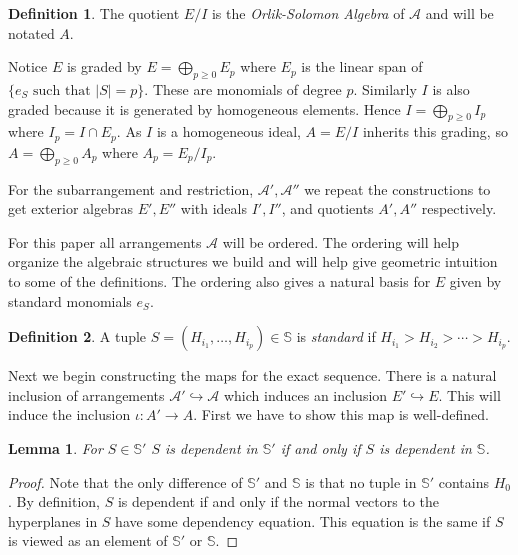 \documentclass[article,twoside]{article}
\newcommand{\BB}[1]{\mathbb{#1}}
\newcommand{\script}[1]{\mathcal{#1}}
\newcommand{\tuples}{\BB{S}}
\theoremstyle{plain}
\theoremstyle{plain}
\newtheorem{lemma}[lemma]{Lemma}
\theoremstyle{plain}
\theoremstyle{plain}
\theoremstyle{plain}
\theoremstyle{definition}
\newtheorem{definition}[definition]{Definition}
\theoremstyle{definition}
\theoremstyle{definition}
\theoremstyle{remark}
\theoremstyle{remark}
\begin{document}
\begin{definition}
	The quotient $E/I$ is the \emph{Orlik-Solomon Algebra} of $\script{A}$ and will be notated $A$.
\end{definition}

Notice $E$ is graded by $E=\bigoplus_{p\geq 0} E_p$ where $E_p$ is the linear span of $\{e_S \text{ such that } |S|=p\}$. These are monomials of degree $p$. Similarly $I$ is also graded because it is generated by homogeneous elements. Hence $I=\bigoplus_{p\geq 0} I_p$ where $I_p=I\cap E_p$. As $I$ is a homogeneous ideal, $A=E/I$ inherits this grading, so $A=\bigoplus_{p\geq 0} A_p$ where $A_p = E_p/I_p$.

For the subarrangement and restriction, $\script{A}',\script{A}''$ we repeat the constructions to get exterior algebras $E',E''$ with ideals $I',I''$, and quotients $A',A''$ respectively.

For this paper all arrangements $\script{A}$ will be ordered. The ordering will help organize the algebraic structures we build and will help give geometric intuition to some of the definitions. The ordering also gives a natural basis for $E$ given by standard monomials $e_S$.

\begin{definition}
	A tuple $S=(H_{i_1},\dots,H_{i_p})\in\tuples$ is \emph{standard} if $H_{i_1}>H_{i_2}>\cdots>H_{i_p}$.
\end{definition}





Next we begin constructing the maps for the exact sequence. There is a natural inclusion of arrangements $\script{A}'\hookrightarrow\script{A}$ which induces an inclusion $E'\hookrightarrow E$. This will induce the inclusion $\iota:A'\to A$. First we have to show this map is well-defined.

\begin{lemma}\label{dependency}
	For $S\in\tuples'$ $S$ is dependent in $\tuples'$ if and only if $S$ is dependent in $\tuples$.
\end{lemma}
\begin{proof}
	Note that the only difference of $\tuples'$ and $\tuples$ is that no tuple in $\tuples'$ contains $H_0$. By definition, $S$ is dependent if and only if the normal vectors to the hyperplanes in $S$ have some dependency equation. This equation is the same if $S$ is viewed as an element of $\tuples'$ or $\tuples$.
\end{proof}
\end{document}
